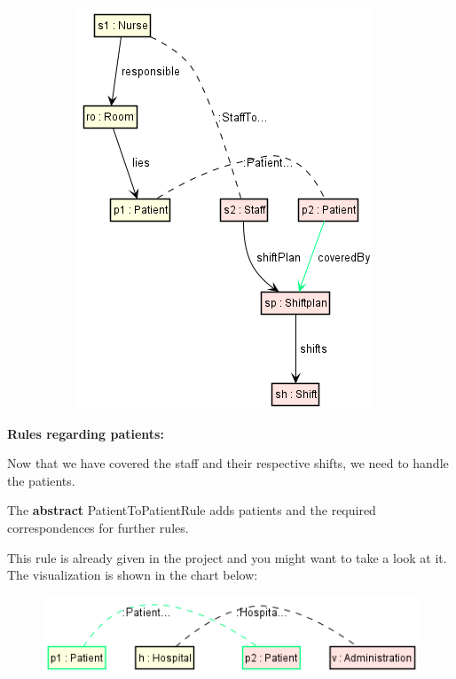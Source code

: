 {\begin{figure}[h]
\begin{subfigure}[b]{0.3\textwidth}
    \end{subfigure}\hspace{2cm}
    \begin{subfigure}[b]{0.3\textwidth}
    
    \includegraphics[scale=0.45 ]{pictures/nurseShiftPlan.png}
    \caption{}
    \label{NurseShiftplanRule}
    
    \end{subfigure}
    
\end{figure}

\clearpage

\textbf{Rules regarding patients:}

Now that we have covered the staff and their respective shifts, we need to handle the patients. 

The \textbf{abstract} \textsf{PatientToPatientRule} adds patients and the required correspondences for further rules.

This rule is already given in the project and you might want to take a look at it. The visualization is shown in the chart below:

\begin{figure}[h]
    \centering
    \includegraphics[scale=0.65 ]{pictures/patientToPatient.png}
    \caption{}
    \label{PatientToPatientRule}
\end{figure}

}
